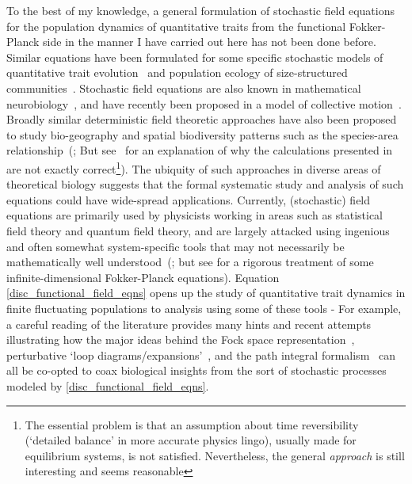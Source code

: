 To the best of my knowledge, a general formulation of stochastic field equations for the population dynamics of quantitative traits from the functional Fokker-Planck side in the manner I have carried out here has not been done before. Similar equations have been formulated for some specific stochastic models of quantitative trait evolution~\citep{rogers_demographic_2012,rogers_modes_2015} and population ecology of size-structured communities~\citep{odwyer_integrative_2009}. Stochastic field equations are also known in mathematical neurobiology~\citep{buice_field-theoretic_2007,bressloff_stochastic_2010,coombes_neural_2014}, and have recently been proposed in a model of collective motion~\citep{o_laighleis_minimal_2018}. Broadly similar deterministic field theoretic approaches have also been proposed to study bio-geography and spatial biodiversity patterns such as the species-area relationship~(\cite{odwyer_field_2010}; But see~\cite{grilli_absence_2012} for an explanation of why the calculations presented in~\cite{odwyer_field_2010} are not exactly correct\footnote{The essential problem is that an assumption about time reversibility (`detailed balance' in more accurate physics lingo), usually made for equilibrium systems, is not satisfied. Nevertheless, the general \emph{approach} is still interesting and seems reasonable}). The ubiquity of such approaches in diverse areas of theoretical biology suggests that the formal systematic study and analysis of such equations could have wide-spread applications. Currently, (stochastic) field equations are primarily used by physicists working in areas such as statistical field theory and quantum field theory, and are largely attacked using ingenious and often somewhat system-specific tools that may not necessarily be mathematically well understood~(\cite{carmona_stochastic_1999}; but see \cite{bogachev_fokker-planck-kolmogorov_2015} for a rigorous treatment of some infinite-dimensional Fokker-Planck equations). Equation \eqref{disc_functional_field_eqns} opens up the study of quantitative trait dynamics in finite fluctuating populations to analysis using some of these tools - For example, a careful reading of the literature provides many hints and recent attempts illustrating how the major ideas behind the Fock space representation~\citep{del_razo_probabilistic_2022}, perturbative `loop diagrams/expansions'~\citep{dodd_many-body_2009}, and the path integral formalism~\citep{doi_second_1976, peliti_path_1985, chow_path_2015, weber_master_2017} can all be co-opted to coax biological insights from the sort of stochastic processes modeled by \eqref{disc_functional_field_eqns}.

